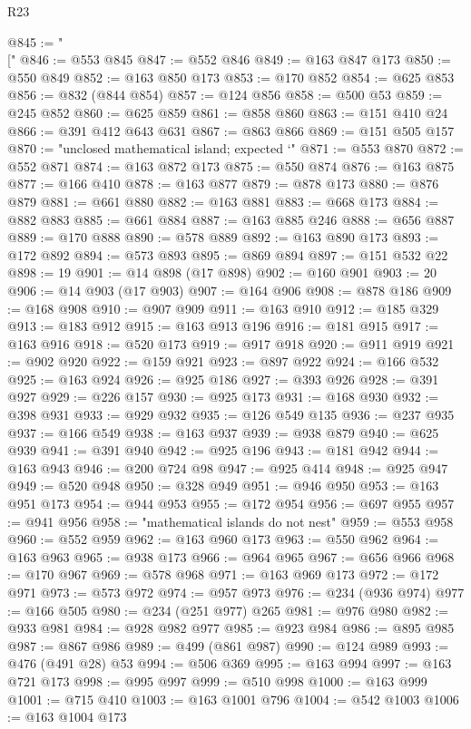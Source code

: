 \begin{lexlean}{R23}
\begin{coremodule}
@845 := "\\["
@846 := @553 @845
@847 := @552 @846
@849 := @163 @847 @173
@850 := @550 @849
@852 := @163 @850 @173
@853 := @170 @852
@854 := @625 @853
@856 := @832 (@844 @854)
@857 := @124 @856
@858 := @500 @53
@859 := @245 @852
@860 := @625 @859
@861 := @858 @860
@863 := @151 @410 @24
@866 := @391 @412 @643 @631
@867 := @863 @866
@869 := @151 @505 @157
@870 := "unclosed mathematical island; expected `"
@871 := @553 @870
@872 := @552 @871
@874 := @163 @872 @173
@875 := @550 @874
@876 := @163 @875
@877 := @166 @410
@878 := @163 @877
@879 := @878 @173
@880 := @876 @879
@881 := @661 @880
@882 := @163 @881
@883 := @668 @173
@884 := @882 @883
@885 := @661 @884
@887 := @163 @885 @246
@888 := @656 @887
@889 := @170 @888
@890 := @578 @889
@892 := @163 @890 @173
@893 := @172 @892
@894 := @573 @893
@895 := @869 @894
@897 := @151 @532 @22
@898 := 19
@901 := @14 @898 (@17 @898)
@902 := @160 @901
@903 := 20
@906 := @14 @903 (@17 @903)
@907 := @164 @906
@908 := @878 @186
@909 := @168 @908
@910 := @907 @909
@911 := @163 @910
@912 := @185 @329
@913 := @183 @912
@915 := @163 @913 @196
@916 := @181 @915
@917 := @163 @916
@918 := @520 @173
@919 := @917 @918
@920 := @911 @919
@921 := @902 @920
@922 := @159 @921
@923 := @897 @922
@924 := @166 @532
@925 := @163 @924
@926 := @925 @186
@927 := @393 @926
@928 := @391 @927
@929 := @226 @157
@930 := @925 @173
@931 := @168 @930
@932 := @398 @931
@933 := @929 @932
@935 := @126 @549 @135
@936 := @237 @935
@937 := @166 @549
@938 := @163 @937
@939 := @938 @879
@940 := @625 @939
@941 := @391 @940
@942 := @925 @196
@943 := @181 @942
@944 := @163 @943
@946 := @200 @724 @98
@947 := @925 @414
@948 := @925 @947
@949 := @520 @948
@950 := @328 @949
@951 := @946 @950
@953 := @163 @951 @173
@954 := @944 @953
@955 := @172 @954
@956 := @697 @955
@957 := @941 @956
@958 := "mathematical islands do not nest"
@959 := @553 @958
@960 := @552 @959
@962 := @163 @960 @173
@963 := @550 @962
@964 := @163 @963
@965 := @938 @173
@966 := @964 @965
@967 := @656 @966
@968 := @170 @967
@969 := @578 @968
@971 := @163 @969 @173
@972 := @172 @971
@973 := @573 @972
@974 := @957 @973
@976 := @234 (@936 @974)
@977 := @166 @505
@980 := @234 (@251 @977) @265
@981 := @976 @980
@982 := @933 @981
@984 := @928 @982 @977
@985 := @923 @984
@986 := @895 @985
@987 := @867 @986
@989 := @499 (@861 @987)
@990 := @124 @989
@993 := @476 (@491 @28) @53
@994 := @506 @369
@995 := @163 @994
@997 := @163 @721 @173
@998 := @995 @997
@999 := @510 @998
@1000 := @163 @999
@1001 := @715 @410
@1003 := @163 @1001 @796
@1004 := @542 @1003
@1006 := @163 @1004 @173

\end{coremodule}
\end{lexlean}
